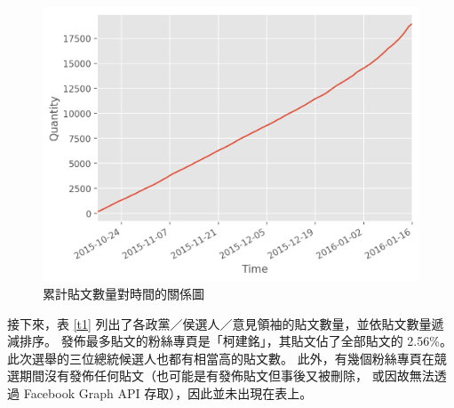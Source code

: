 \documentclass[letterpaper, 10pt, conference]{ieeeconf}   %
\begin{document}
\begin{CJK}{UTF8}{bsmi}
\begin{figure}[!htbp]
\centering
\includegraphics[width=\columnwidth]{quantity_time_cumulative_graph}
\caption{累計貼文數量對時間的關係圖}
\label{f2}
\end{figure}

接下來，表 \ref{t1} 列出了各政黨／侯選人／意見領袖的貼文數量，並依貼文數量遞減排序。%
發佈最多貼文的粉絲專頁是「柯建銘」，其貼文佔了全部貼文的 2.56\%。%
此次選舉的三位總統候選人也都有相當高的貼文數。%
此外，有幾個粉絲專頁在競選期間沒有發佈任何貼文（也可能是有發佈貼文但事後又被刪除，%
或因故無法透過 Facebook Graph API 存取），因此並未出現在表上。%

\onecolumn


\end{CJK}
\end{document}
